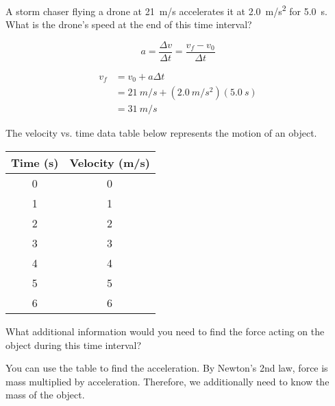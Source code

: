 \documentclass[answers]{exam}
\begin{document}
\begin{questions}
\question
A storm chaser flying a drone at \SI{21}{m/s} accelerates it at \SI{2.0}{m/s^2} for \SI{5.0}{s}. What is the drone's speed at the end of this time interval?


\begin{solution}
\begin{equation*}
    a = \frac{\Delta v}{\Delta t} = \frac{v_f - v_0}{\Delta t}
\end{equation*}

\vspace{-1ex}
\begin{align*}
    v_f &= v_0 + a \Delta t \\[1ex]
    &= \SI{21}{m/s} + \left(\SI{2.0}{m/s^2}\right)(\SI{5.0}{s}) \\[1ex]
    &= \boxed{\SI{31}{m/s}}
\end{align*}
\end{solution}

\question
The velocity vs. time data table below represents the motion of an object.

\begin{center}
    \begin{tabular}{|c|c|}
        \hline
         \textbf{Time} (s) & \textbf{Velocity} (m/s) \\ \hline
         0 & 0 \\ \hline
         1 & 1 \\ \hline
         2 & 2 \\ \hline
         3 & 3 \\ \hline
         4 & 4 \\ \hline
         5 & 5 \\ \hline
         6 & 6 \\ \hline
    \end{tabular}
\end{center}

What additional information would you need to find the force acting on the object during this time interval?

\ifprintanswers
\else
\fillwithlines{2cm}
\fi

\begin{solution}
    You can use the table to find the acceleration. By Newton's 2nd law, force is mass multiplied by acceleration. Therefore, we additionally need to know the mass of the object. 
\end{solution}




\end{questions}
\end{document}
